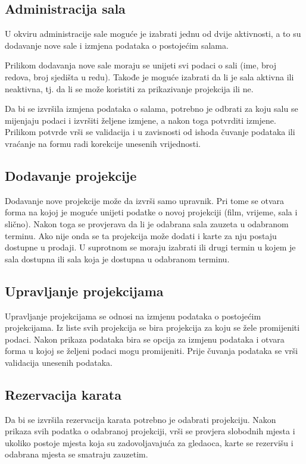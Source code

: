 \subsection{Administracija sala}
U okviru administracije sale moguće je izabrati jednu od dvije aktivnosti, a to su dodavanje nove sale i izmjena podataka o postojećim salama.

Prilikom dodavanja nove sale moraju se unijeti svi podaci o sali (ime, broj redova, broj sjedišta u redu). Takođe je moguće izabrati da li je sala aktivna ili neaktivna, tj. da li se može koristiti za prikazivanje projekcija ili ne.

Da bi se izvršila izmjena podataka o salama, potrebno je odbrati za koju salu se mijenjaju podaci i izvršiti željene izmjene, a nakon toga potvrditi izmjene. Prilikom potvrde  vrši se validacija i u zavisnosti od ishoda čuvanje podataka ili vraćanje na formu radi korekcije unesenih vrijednosti.

\subsection{Dodavanje projekcije}
Dodavanje nove projekcije može da izvrši samo upravnik. Pri tome se otvara forma na kojoj je moguće unijeti podatke o novoj 
projekciji (film, vrijeme, sala i slično). Nakon toga se provjerava da li je odabrana 
sala zauzeta u odabranom terminu. Ako nije onda se ta projekcija može dodati i karte za nju postaju dostupne u prodaji. U suprotnom 
se moraju izabrati ili drugi termin u kojem je sala dostupna ili sala koja je dostupna u odabranom terminu.

\subsection{Upravljanje projekcijama}
Upravljanje projekcijama se odnosi na izmjenu podataka o postojećim projekcijama. Iz liste svih projekcija se bira projekcija 
za koju se žele promijeniti podaci. Nakon prikaza podataka bira se opcija za izmjenu podataka i otvara forma u kojoj se 
željeni podaci mogu promijeniti. Prije čuvanja podataka se vrši validacija unesenih podataka.

\subsection{Rezervacija karata}
Da bi se izvršila rezervacija karata potrebno je odabrati projekciju. Nakon prikaza svih podatka o odabranoj projekciji, 
vrši se provjera slobodnih mjesta i ukoliko postoje mjesta koja su zadovoljavajuća za gledaoca, karte se rezervišu 
i odabrana mjesta se smatraju zauzetim.

